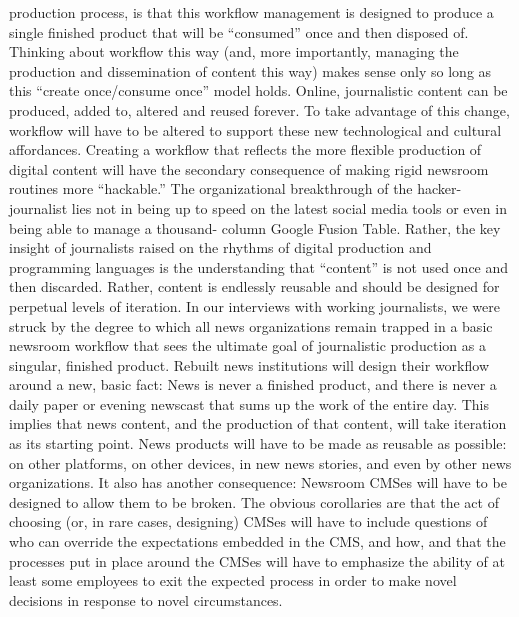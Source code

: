 production process, is that this workflow management is designed to produce
a single finished product that will be ``consumed'' once and then disposed of.
Thinking about workflow this way (and, more importantly, managing the production
and dissemination of content this way) makes sense only so long as this
``create once/consume once'' model holds.
Online, journalistic content can be produced, added to, altered and reused forever.
To take advantage of this change, workflow will have to be altered to support
these new technological and cultural affordances. Creating a workflow that
reflects the more flexible production of digital content will have the secondary
consequence of making rigid newsroom routines more ``hackable.''
The organizational breakthrough of the hacker-journalist lies not in being up to
speed on the latest social media tools or even in being able to manage a thousand-
column Google Fusion Table. Rather, the key insight of journalists raised
on the rhythms of digital production and programming languages is the understanding
that ``content'' is not used once and then discarded. Rather, content is
endlessly reusable and should be designed for perpetual levels of iteration. In our
interviews with working journalists, we were struck by the degree to which all
news organizations remain trapped in a basic newsroom workflow that sees the
ultimate goal of journalistic production as a singular, finished product. Rebuilt
news institutions will design their workflow around a new, basic fact: News is
never a finished product, and there is never a daily paper or evening newscast that
sums up the work of the entire day.
This implies that news content, and the production of that content, will take
iteration as its starting point. News products will have to be made as reusable as
possible: on other platforms, on other devices, in new news stories, and even by
other news organizations.
It also has another consequence: Newsroom CMSes will have to be designed to
allow them to be broken. The obvious corollaries are that the act of choosing
(or, in rare cases, designing) CMSes will have to include questions of who can
override the expectations embedded in the CMS, and how, and that the processes
put in place around the CMSes will have to emphasize the ability of at least
some employees to exit the expected process in order to make novel decisions in
response to novel circumstances.

